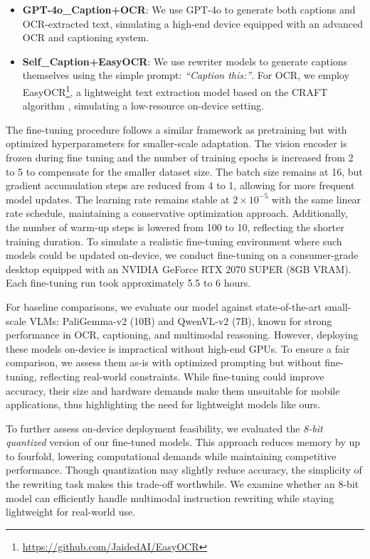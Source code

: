 \begin{itemize}
\item \textbf{GPT-4o\_Caption+OCR}: We use GPT-4o to generate both captions and OCR-extracted text, simulating a high-end device equipped with an advanced OCR and captioning system.
\item \textbf{Self\_Caption+EasyOCR}: We use rewriter models to generate captions themselves using the simple prompt: \textit{“Caption this:”}. For OCR, we employ EasyOCR\footnote{\url{https://github.com/JaidedAI/EasyOCR}}, a lightweight text extraction model based on the CRAFT algorithm \cite{baek2019character}, simulating a low-resource on-device setting.
\end{itemize}

The fine-tuning procedure follows a similar framework as pretraining but with optimized hyperparameters for smaller-scale adaptation. The vision encoder is frozen during fine tuning and the number of training epochs is increased from 2 to 5 to compensate for the smaller dataset size. The batch size remains at 16, but gradient accumulation steps are reduced from 4 to 1, allowing for more frequent model updates. The learning rate remains stable at $2\times10^{-5}$ with the same linear rate schedule, maintaining a conservative optimization approach. Additionally, the number of warm-up steps is lowered from 100 to 10, reflecting the shorter training duration. To simulate a realistic fine-tuning environment where such models could be updated on-device, we conduct fine-tuning on a consumer-grade desktop equipped with an NVIDIA GeForce RTX 2070 SUPER (8GB VRAM). Each fine-tuning run took approximately 5.5 to 6 hours.

For baseline comparisons, we evaluate our model against state-of-the-art small-scale VLMs: PaliGemma-v2 (10B) and QwenVL-v2 (7B), known for strong performance in OCR, captioning, and multimodal reasoning. However, deploying these models on-device is impractical without high-end GPUs. To ensure a fair comparison, we assess them as-is with optimized prompting but without fine-tuning, reflecting real-world constraints. While fine-tuning could improve accuracy, their size and hardware demands make them unsuitable for mobile applications, thus highlighting the need for lightweight models like ours.

To further assess on-device deployment feasibility, we evaluated the \textit{8-bit quantized} version of our fine-tuned models. This approach reduces memory by up to fourfold, lowering computational demands while maintaining competitive performance. Though quantization may slightly reduce accuracy, the simplicity of the rewriting task makes this trade-off worthwhile. We examine whether an 8-bit model can efficiently handle multimodal instruction rewriting while staying lightweight for real-world use.

